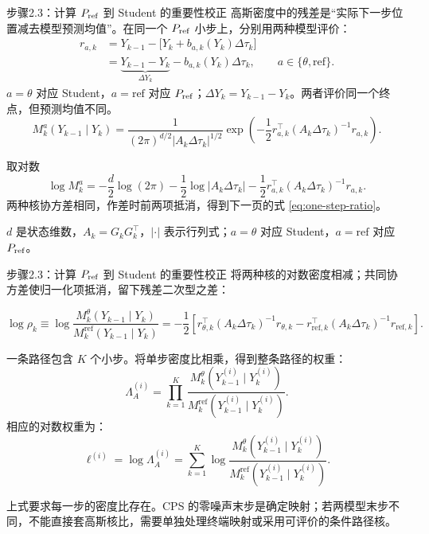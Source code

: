 \documentclass[10pt,aspectratio=169]{beamer}
\begin{document}
\begin{frame}{步骤2.3：计算 \ensuremath{P_{\rm ref}} 到 Student 的重要性校正}
\small
高斯密度中的残差是“实际下一步位置减去模型预测均值”。在同一个 \ensuremath{P_{\rm ref}} 小步上，分别用两种模型评价：
\begin{equation}\label{eq:residual-derivation}
\begin{aligned}
r_{a,k}&=Y_{k-1}-\bigl[Y_k+b_{a,k}(Y_k)\Delta\tau_k\bigr]\\
&=\underbrace{Y_{k-1}-Y_k}_{\Delta Y_k}-b_{a,k}(Y_k)\Delta\tau_k,
\qquad a\in\{\theta,\mathrm{ref}\}.
\end{aligned}
\end{equation}
$a=\theta$ 对应 Student，$a=\mathrm{ref}$ 对应 \ensuremath{P_{\rm ref}}；$\Delta Y_k=Y_{k-1}-Y_k$。两者评价同一个终点，但预测均值不同。
\begin{equation}\label{eq:gaussian-density}
\boxed{M_k^a(Y_{k-1}\mid Y_k)=
\frac{1}{(2\pi)^{d/2}|A_k\Delta\tau_k|^{1/2}}
\exp\!\left(-\frac12 r_{a,k}^{\top}(A_k\Delta\tau_k)^{-1}r_{a,k}\right).}
\end{equation}
\begin{block}{取对数}
\begin{equation}\label{eq:log-gaussian}
\log M_k^a=-\frac d2\log(2\pi)-\frac12\log|A_k\Delta\tau_k|
-\frac12r_{a,k}^{\top}(A_k\Delta\tau_k)^{-1}r_{a,k}.
\end{equation}
两种核协方差相同，作差时前两项抵消，得到下一页的式 \eqref{eq:one-step-ratio}。

$d$ 是状态维数，$A_k=G_kG_k^\top$，$|\cdot|$ 表示行列式；$a=\theta$ 对应 Student，$a=\mathrm{ref}$ 对应 \ensuremath{P_{\rm ref}}。
\end{block}
\end{frame}

\begin{frame}{步骤2.3：计算 \ensuremath{P_{\rm ref}} 到 Student 的重要性校正}
\small
将两种核的对数密度相减；共同协方差使归一化项抵消，留下残差二次型之差：

\begin{equation}\label{eq:one-step-ratio}
\log\rho_k\equiv\log\frac{M_k^\theta(Y_{k-1}\mid Y_k)}{M_k^\mathrm{ref}(Y_{k-1}\mid Y_k)}
=-\frac12\left[r_{\theta,k}^{\top}(A_k\Delta\tau_k)^{-1}r_{\theta,k}
-r_{\mathrm{ref},k}^{\top}(A_k\Delta\tau_k)^{-1}r_{\mathrm{ref},k}\right].
\end{equation}

一条路径包含 $K$ 个小步。将单步密度比相乘，得到整条路径的权重：
\begin{equation}
\Lambda_A^{(i)}=\prod_{k=1}^{K}
\frac{M_k^\theta(Y_{k-1}^{(i)}\mid Y_k^{(i)})}
{M_k^\mathrm{ref}(Y_{k-1}^{(i)}\mid Y_k^{(i)})}.
\end{equation}
相应的对数权重为：
\begin{equation}
\ell^{(i)}=\log\Lambda_A^{(i)}
=\sum_{k=1}^{K}\log\frac{M_k^\theta(Y_{k-1}^{(i)}\mid Y_k^{(i)})}
{M_k^\mathrm{ref}(Y_{k-1}^{(i)}\mid Y_k^{(i)})}.
\end{equation}

\small 上式要求每一步的密度比存在。CPS 的零噪声末步是确定映射；若两模型末步不同，不能直接套高斯核比，需要单独处理终端映射或采用可评价的条件路径核。
\end{frame}
\end{document}
